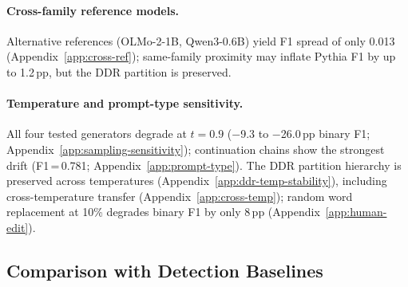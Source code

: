 \paragraph{Cross-family reference models.}
 Alternative references (OLMo-2-1B, Qwen3-0.6B) yield F1 spread of only 0.013 (Appendix~\ref{app:cross-ref}); same-family proximity may inflate Pythia F1 by up to 1.2\,pp, but the DDR partition is preserved.

\paragraph{Temperature and prompt-type sensitivity.}
 All four tested generators degrade at $t{=}0.9$ ($-$9.3 to $-$26.0\,pp binary F1; Appendix~\ref{app:sampling-sensitivity}); continuation chains show the strongest drift (F1\,=\,0.781; Appendix~\ref{app:prompt-type}).
The DDR partition hierarchy is preserved across temperatures (Appendix~\ref{app:ddr-temp-stability}), including cross-temperature transfer (Appendix~\ref{app:cross-temp}); random word replacement at 10\% degrades binary F1 by only 8\,pp (Appendix~\ref{app:human-edit}).


\subsection{Comparison with Detection Baselines}
\label{sec:results-baselines}

\begin{table}[t]
\centering
\footnotesize
\caption{Depth classification (8-gen LOGO, pooled). Binary F1 excludes gen-0. 7-feature: one 410M model; 4-det ensembles: two models, 1.4B. QLoRA (\S\ref{sec:results-classification}) uses full token sequences (within-model 5-fold CV, not LOGO), serving as an information-asymmetric ceiling.}
\label{tab:baselines}
\end{table}


